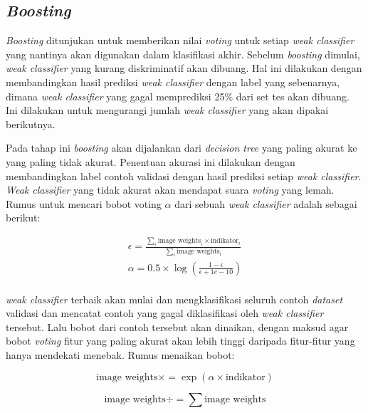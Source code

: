 \subsection{\emph{Boosting}}

\emph{Boosting} ditunjukan untuk memberikan nilai \emph{voting} untuk setiap \textit{weak classifier} 
yang nantinya akan digunakan dalam klasifikasi akhir. Sebelum \emph{boosting} dimulai, 
\textit{weak classifier} yang kurang diskriminatif akan dibuang. Hal ini dilakukan dengan 
membandingkan hasil prediksi \textit{weak classifier} dengan label yang sebenarnya, dimana 
\textit{weak classifier} yang gagal memprediksi 25\% dari set tes akan dibuang. Ini dilakukan 
untuk mengurangi jumlah \textit{weak classifier} yang akan dipakai berikutnya.

Pada tahap ini \textit{boosting} 
akan dijalankan dari \textit{decision tree} yang paling akurat ke yang paling tidak akurat. Penentuan 
akurasi ini dilakukan dengan membandingkan label contoh validasi dengan hasil prediksi setiap \textit{weak classifier}. 
\textit{Weak classifier} yang tidak akurat akan mendapat suara \textit{voting} yang lemah. Rumus untuk mencari 
bobot voting \( \alpha \) dari sebuah \textit{weak classifier} adalah sebagai berikut:

\begin{equation}
  \begin{split}
    \epsilon = \frac{\sum_{i} \text{{image weights}}_i \times \text{{indikator}}_i}{\sum_{i} \text{{image weights}}_i} \\
   \alpha = 0.5 \times \log\left(\frac{1 - \epsilon}{\epsilon + 1e-10}\right) \\
  \end{split}
\end{equation}

\emph{weak classifier} terbaik akan mulai dan 
mengklasifikasi seluruh contoh \emph{dataset} validasi dan mencatat contoh yang 
gagal diklasifikasi oleh \emph{weak classifier} tersebut. Lalu bobot dari contoh tersebut akan 
dinaikan, dengan maksud agar bobot \textit{voting} fitur yang paling akurat akan lebih tinggi daripada 
fitur-fitur yang hanya mendekati menebak. Rumus menaikan bobot:

\begin{equation}
  \text{{image weights}} \times= \exp(\alpha \times \text{{indikator}})
\end{equation}
  
\begin{equation}
  \text{{image weights}} \div= \sum \text{{image weights}}
\end{equation}

